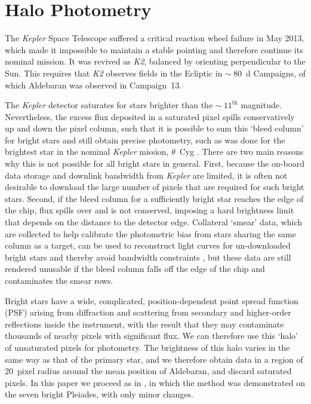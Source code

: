 \documentclass[modern]{aastex61}
\newcommand{\kepler}{\emph{Kepler}\xspace}
\newcommand{\ktwo}{\emph{K2}\xspace}
\begin{document}
\section{Halo Photometry}
\label{halo}

The \kepler Space Telescope \citep{2010sci...327..977b}
suffered a critical reaction wheel failure in May 2013, which made it impossible to maintain a stable pointing and therefore continue its nominal mission. It was revived as \ktwo \citep{howell14}, balanced by orienting perpendicular to the Sun. This requires that \ktwo observes fields in the Ecliptic in $\sim~80$~d Campaigns, of which Aldebaran was observed in Campaign~13.

The \kepler detector saturates for stars brighter than the $\sim~11^\text{th}$ magnitude. Nevertheless, the excess flux deposited in a saturated pixel spills conservatively up and down the pixel column, such that it is possible to sum this `bleed column' for bright stars and still obtain precise photometry, such as was done for the brightest star in the nominal \kepler mission, $\theta$~Cyg \citep[$V = 4.48$;][]{guzik2011,thetacygwhite,guzik2016}. There are two main reasons why this is not possible for all bright stars in general. First, because the on-board data storage and downlink bandwidth from \kepler are limited, it is often not desirable to download the large number of pixels that are required for such bright stars. Second, if the bleed column for a sufficiently bright star reaches the edge of the chip, flux spills over and is not conserved, imposing a hard brightness limit that depends on the distance to the detector edge.
Collateral `smear' data, which are collected to help calibrate the photometric bias from stars sharing the same column as a target, can be used to reconstruct light curves for un-downloaded bright stars and thereby avoid bandwidth constraints \citep{k2smear}, but these data are still rendered unusable if the bleed column falls off the edge of the chip and contaminates the smear rows.

Bright stars have a wide, complicated, position-dependent point spread function (PSF) arising from diffraction and scattering from secondary and higher-order reflections inside the instrument, with the result that they may contaminate thousands of nearby pixels with significant flux. We can therefore use this `halo' of unsaturated pixels for photometry. The brightness of this halo varies in the same way as that of the primary star, and we therefore obtain data in a region of 20~pixel radius around the mean position of Aldebaran, and discard saturated pixels.
In this paper we proceed as in \citet{White2017}, in which the method was demonstrated on the seven bright Pleiades, with only minor changes.
\end{document}

